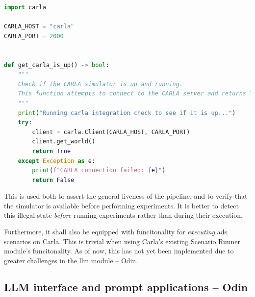 \begin{lstlisting}[caption={Exerpt from carla\_interface.py, demonstrating the implementation of a Carla health check.}, label={lst:odinCarlaHealthCheck}, language={Python}]
import carla

CARLA_HOST = "carla"
CARLA_PORT = 2000


def get_carla_is_up() -> bool:
    """
    Check if the CARLA simulator is up and running.
    This function attempts to connect to the CARLA server and returns True if successful, otherwise False.
    """
    print("Running carla integration check to see if it is up...")
    try:
        client = carla.Client(CARLA_HOST, CARLA_PORT)
        client.get_world()
        return True
    except Exception as e:
        print(f"CARLA connection failed: {e}")
        return False
\end{lstlisting}

This is used both to assert the general liveness of the \hefe pipeline, and to
verify that the simulator is available before performing experiments. It is
better to detect this illegal state \emph{before} running experiments rather
than during their execution.

Furthermore, it shall also be equipped with funcitonality for \emph{executing} \acrshort{ads}
scenarios on Carla. This is trivial when using Carla's existing Scenario Runner
module's funcitonality. As of now, this has not yet been implemented due to
greater challenges in the \acrshort{llm} module -- Odin.



\subsection{LLM interface and prompt applications -- Odin}\label{sec:odinImplementation}


